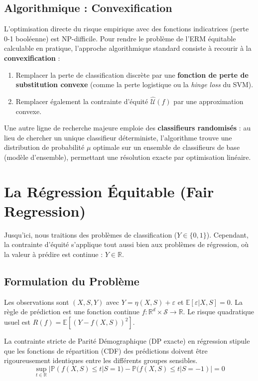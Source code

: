 \subsection{Algorithmique : Convexification}

L'optimisation directe du risque empirique avec des fonctions indicatrices (perte 0-1 booléenne) est NP-difficile. Pour rendre le problème de l'ERM équitable calculable en pratique, l'approche algorithmique standard consiste à recourir à la \textbf{convexification} :
\begin{enumerate}
    \item Remplacer la perte de classification discrète par une \textbf{fonction de perte de substitution convexe} (comme la perte logistique ou la \textit{hinge loss} du SVM).
    \item Remplacer également la contrainte d'équité $\hat{\mathcal{U}}(f)$ par une approximation convexe.
\end{enumerate}

Une autre ligne de recherche majeure emploie des \textbf{classifieurs randomisés} : au lieu de chercher un unique classifieur déterministe, l'algorithme trouve une distribution de probabilité $\mu$ optimale sur un ensemble de classifieurs de base (modèle d'ensemble), permettant une résolution exacte par optimisation linéaire.

\section{La Régression Équitable (Fair Regression)}

Jusqu'ici, nous traitions des problèmes de classification ($Y \in \{0, 1\}$). Cependant, la contrainte d'équité s'applique tout aussi bien aux problèmes de régression, où la valeur à prédire est continue : $Y \in \mathbb{R}$.

\subsection{Formulation du Problème}
Les observations sont $(X, S, Y)$ avec $Y = \eta(X, S) + \varepsilon$ et $\mathbb{E}[\varepsilon | X, S] = 0$.
La règle de prédiction est une fonction continue $f : \mathbb{R}^d \times \mathcal{S} \to \mathbb{R}$.
Le risque quadratique usuel est $R(f) = \mathbb{E}[(Y - f(X,S))^2]$.

La contrainte stricte de Parité Démographique (DP exacte) en régression stipule que les fonctions de répartition (CDF) des prédictions doivent être rigoureusement identiques entre les différents groupes sensibles.
\begin{equation}
    \sup_{t \in \mathbb{R}} | \mathbb{P}(f(X,S) \le t | S = 1) - \mathbb{P}(f(X,S) \le t | S = -1) | = 0
\end{equation}

